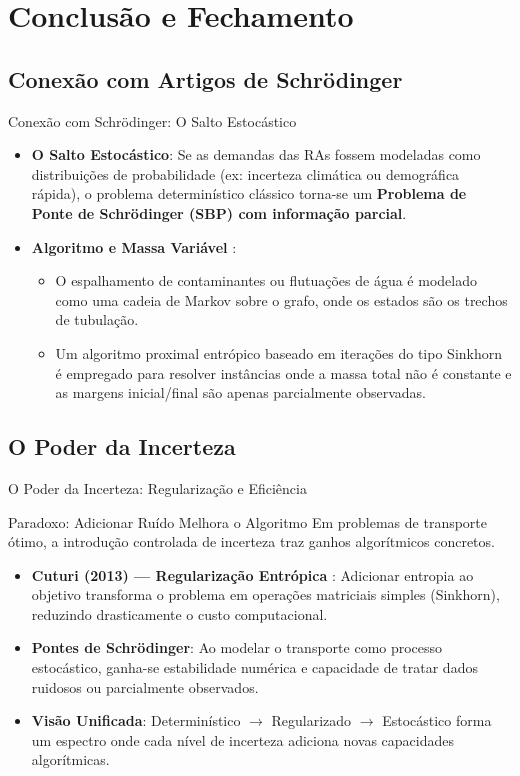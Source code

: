 \section{Conclusão e Fechamento}

\subsection{Conexão com Artigos de Schrödinger}
\begin{frame}{Conexão com Schrödinger: O Salto Estocástico}
  \small
  \begin{itemize}
    \item \textbf{O Salto Estocástico}: Se as demandas das RAs fossem modeladas como distribuições de probabilidade (ex: incerteza climática ou demográfica rápida), o problema determinístico clássico torna-se um \textbf{Problema de Ponte de Schrödinger (SBP) com informação parcial}.
    \item \textbf{Algoritmo e Massa Variável} \cite{mascherpa2023estimating}:
    \begin{itemize}
      \scriptsize
      \item O espalhamento de contaminantes ou flutuações de água é modelado como uma cadeia de Markov sobre o grafo, onde os estados são os trechos de tubulação.
      \item Um algoritmo proximal entrópico baseado em iterações do tipo Sinkhorn é empregado para resolver instâncias onde a massa total não é constante e as margens inicial/final são apenas parcialmente observadas.
    \end{itemize}
  \end{itemize}
\end{frame}

\subsection{O Poder da Incerteza}
\begin{frame}{O Poder da Incerteza: Regularização e Eficiência}
  \small
  \begin{block}{Paradoxo: Adicionar Ruído Melhora o Algoritmo}
    {\footnotesize Em problemas de transporte ótimo, a introdução controlada de incerteza traz ganhos algorítmicos concretos.}
  \end{block}

  \begin{itemize}
    \setlength{\itemsep}{8pt}
    \item \textbf{Cuturi (2013) --- Regularização Entrópica} \cite{cuturi2013sinkhorn}: Adicionar entropia ao objetivo transforma o problema em operações matriciais simples (Sinkhorn), reduzindo drasticamente o custo computacional.
    \item \textbf{Pontes de Schrödinger}: Ao modelar o transporte como processo estocástico, ganha-se estabilidade numérica e capacidade de tratar dados ruidosos ou parcialmente observados.
    \item \textbf{Visão Unificada}: Determinístico $\rightarrow$ Regularizado $\rightarrow$ Estocástico forma um espectro onde cada nível de incerteza adiciona novas capacidades algorítmicas.
  \end{itemize}
\end{frame}


